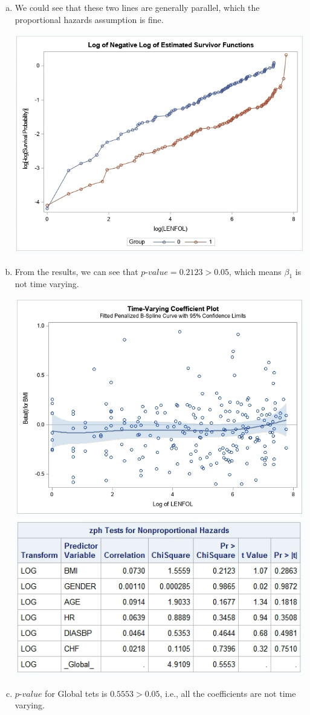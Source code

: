 \documentclass{elegantbook}
\begin{document}
\begin{solution}
\begin{enumerate}
\begin{enumerate}[(a)]
            \item We could see that these two lines are generally parallel, which the proportional hazards assumption is fine. 
            \begin{center}
                \includegraphics[width=.6\textwidth]{q3a.png}
            \end{center}
            \item From the results, we can see that $p$-$value=0.2123>0.05$, which means $\beta_1$ is not time varying. 
            \begin{center}
                \includegraphics[width=.6\textwidth]{q3b1.png}
                \includegraphics[width=.6\textwidth]{q3b2.png}
            \end{center}
            \item $p$-$value$ for Global tets is $0.5553>0.05$, i.e., all the coefficients are not time varying. 
        \end{enumerate}
    \end{enumerate}
\end{solution}
\end{document}
